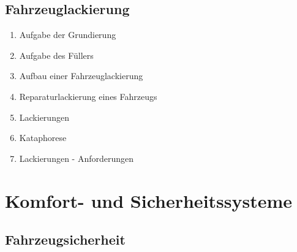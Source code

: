 \subsection{Fahrzeuglackierung}\label{fahrzeuglackierung}

\begin{enumerate}
\item
  Aufgabe der Grundierung\\
\item
  Aufgabe des Füllers\\
\item
  Aufbau einer Fahrzeuglackierung\\
\item
  Reparaturlackierung eines Fahrzeugs\\
\item
  Lackierungen\\
\item
  Kataphorese\\
\item
  Lackierungen - Anforderungen
\end{enumerate}

\section{Komfort- und
Sicherheitssysteme}\label{komfort--und-sicherheitssysteme}

\subsection{Fahrzeugsicherheit}\label{fahrzeugsicherheit}

